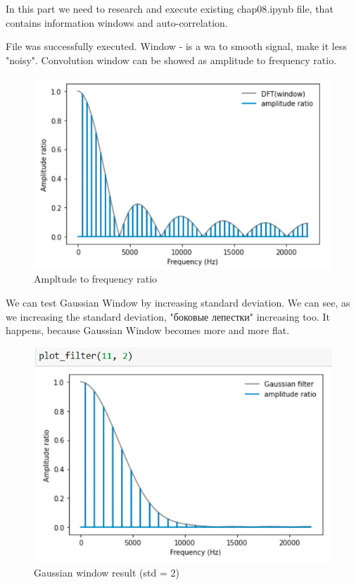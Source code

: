 \documentclass[a4paper]{article}
\begin{document}
        In this part we need to research and execute existing chap08.ipynb file, that contains information windows and auto-correlation.
        
        File was successfully executed. Window - is a wa to smooth signal, make it less "noisy". Convolution window can be showed as amplitude to frequency ratio.
        
        \begin{figure}[H]
            \centering
            \includegraphics[width=\textwidth]{img/p1_1.png}
            \caption{Ampltude to frequency ratio}
            \label{fig:p1_2}
        \end{figure}
        
        We can test Gaussian Window by increasing standard deviation. We can see, as we increasing the standard deviation, "боковые лепестки" increasing too. It happens, because Gaussian Window becomes more and more flat.
        
        \begin{figure}[H]
            \centering
            \includegraphics[width=\textwidth]{img/p1_2.png}
            \caption{Gaussian window result (std = 2)}
            \label{fig:p1_1}
        \end{figure}
        
\end{document}
